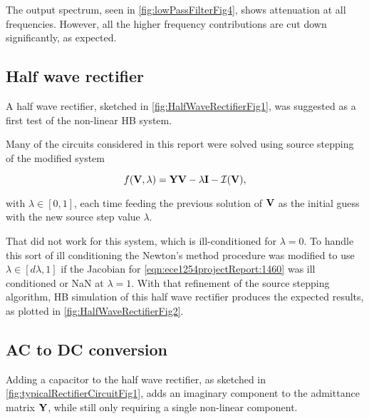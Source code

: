 The output spectrum, seen in \cref{fig:lowPassFilterFig4},
shows attenuation at all frequencies.
However, all the higher frequency contributions are cut down significantly, as expected.


\subsection{Half wave rectifier}

A half wave rectifier, sketched in \cref{fig:HalfWaveRectifierFig1}, was suggested as a first test of the non-linear HB system.


Many of the circuits considered in this report were solved using source stepping of the modified system

\begin{equation}\label{eqn:ece1254projectReport:1460}
f(\BV, \lambda) = \BY \BV - \lambda \BI - \mathcal{I}(\BV),
\end{equation}

with \( \lambda \in [0, 1] \), each time feeding the previous solution of \( \mathbf{V} \) as the initial guess with the new source step value \( \lambda \).

That did not work for this system, which is ill-conditioned for \( \lambda = 0 \).
To handle this sort of ill conditioning the Newton's method procedure was modified to use \( \lambda \in [d\lambda, 1] \) if the Jacobian for \cref{eqn:ece1254projectReport:1460} was ill conditioned or NaN at \( \lambda = 1 \).
With that refinement of the source stepping algorithm, HB simulation of this half wave rectifier produces the expected results, as plotted in \cref{fig:HalfWaveRectifierFig2}.



\subsection{AC to DC conversion}

Adding a capacitor to the half wave rectifier, as sketched in \cref{fig:typicalRectifierCircuitFig1}, adds an imaginary component to the admittance matrix \( \mathbf{Y} \), while still only requiring a single non-linear component.

